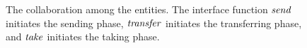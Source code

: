 \begin{figure}[htbp]
	\centering
	
	\caption{The collaboration among the entities. The interface function $\mathit{send}$ initiates the sending phase, $\mathit{transfer}$ initiates the transferring phase, and $\mathit{take}$ initiates the taking phase. %
	\label{Fig::functions}}
\end{figure}


